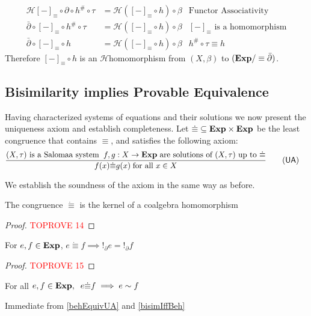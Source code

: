 \documentclass[a4paper,UKenglish,cleveref, autoref, thm-restate]{lipics-v2021}
\newcommand{\Exp}{\textbf{\upshape{Exp}}}
\newcommand{\HCo}{$\mathcal{H}$\text{-coalgebra }}
\theoremstyle{plain}\newtheoremrep{thm}{Theorem}[section]
\begin{document}
\begin{appendixproof}
\begin{align*}
			\mathcal{H}[-]_\equiv \circ \partial \circ h^{\#}\circ \tau &= \mathcal{H}([-]_\equiv \circ h) \circ \beta & \text{Functor Associativity}\\
			\bar\partial \circ [-]_\equiv \circ h^{\#}\circ \tau &= \mathcal{H}([-]_\equiv \circ h) \circ \beta & [-]_\equiv \text{ is a homomorphism}\\
			\bar\partial \circ [-]_\equiv \circ h &= \mathcal{H}([-]_\equiv \circ h) \circ \beta & h^{\#}\circ \tau \equiv h
		\end{align*}
		Therefore $[-]_\equiv \circ h$ is an \HCo  homomorphism from $(X, \beta)$ to $(\Exp/\equiv \bar\partial)$.
	\end{appendixproof}

	\subsection{Bisimilarity implies Provable Equivalence} 
	Having characterized systems of equations and their solutions we now present the uniqueness axiom and establish completeness. Let $\dot\equiv \subseteq \Exp \times \Exp$ be the least congruence that contains $\equiv$, and satisfies the following axiom:
	\begin{align*}
		&\frac{(X, \tau) \text{ is a Salomaa system}\;\;f,g:X\to\Exp \text{ are solutions of }(X, \tau) \text{ up to } \dot\equiv}{f(x) \dot\equiv g(x)\; \text{for all } x\in X} \tag{\textsf{UA}}
	\end{align*}
	
	We establish the soundness of the axiom in the same way as before.
	\begin{toappendix}
		\begin{lem}
			The congruence $\dot\equiv$ is the kernel of a coalgebra homomorphism \label{dotKernel}
		\end{lem}
		\begin{proof}\textcolor{red}{TOPROVE 14}\end{proof}
	\end{toappendix}
	\begin{toappendix}
		\begin{cor} \label{behEquivUA}
			For $e,f \in \Exp$, $e \dot\equiv f \implies !_\partial e=!_\partial f$
		\end{cor}
		\begin{proof}\textcolor{red}{TOPROVE 15}\end{proof}
	\end{toappendix}
	
	\begin{thmrep}
		For all $e,f \in \Exp,\;\; e \dot\equiv f \implies e \sim f$
	\end{thmrep}
	\begin{appendixproof}
		Immediate from \cref{behEquivUA} and \cref{bisimIffBeh} 
	\end{appendixproof}
	
\end{document}
